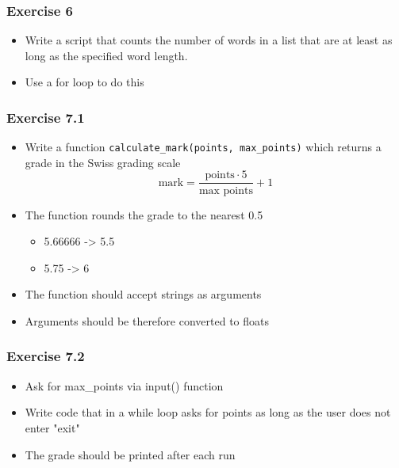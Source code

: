 \documentclass[10pt, a4paper]{beamer} %
\begin{document}
{\begin{frame}[c, fragile]\frametitle{Exercise 6}
	\begin{itemize}
		\item Write a script that counts the number of words in a list that are at least as long
		      as the specified word length.
		\item Use a for loop to do this
	\end{itemize}


\end{frame}

\begin{frame}\frametitle{Exercise 7.1}

	\begin{itemize}
		\item Write a function \texttt{calculate\_mark(points, max\_points)} which returns a grade in the Swiss grading scale
		      \[ \text{mark} = \frac{\text{points}\cdot 5}{\text{max points}} + 1 \]
		\item The function rounds the grade to the nearest 0.5
		      \begin{itemize}
			      \item 5.66666 -> 5.5
			      \item 5.75 -> 6
		      \end{itemize}
		\item The function should accept strings as arguments
		\item Arguments should be therefore converted to floats
	\end{itemize}

\end{frame}
\begin{frame}\frametitle{Exercise 7.2}

	\begin{itemize}
		\item Ask for max\_points via input() function
		\item Write code that in a while loop asks for points as long as the user does not enter "exit"
		\item The grade should be printed after each run
	\end{itemize}


\end{frame}}
\end{document}
